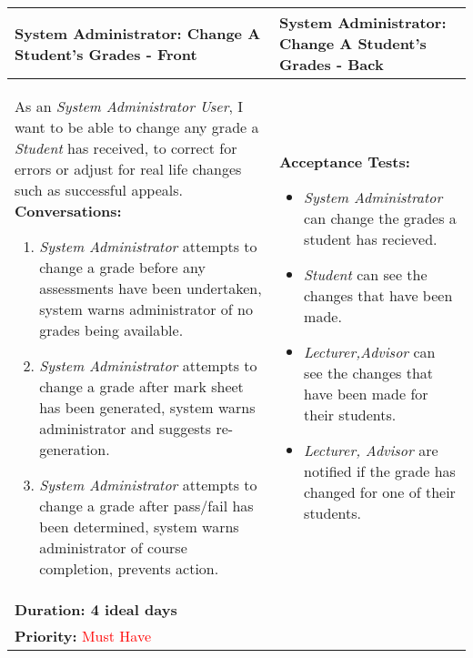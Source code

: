 \documentclass[11pt]{article}
\begin{document}
\begin{center}
\begin{tabular}{ | m{8cm}  |  m{8cm}  | } 
 \hline
 \textbf{System Administrator: Change A Student's Grades - Front} &  \textbf{System Administrator: Change A Student's Grades - Back}  \\ 
  \hline
As an \emph{System Administrator User}, I want to be able to change any grade a \emph{Student} has received, to correct for errors or adjust for real life changes such as successful appeals.  \newline
\textbf{Conversations:}
\begin{enumerate}
\item{\emph{System Administrator} attempts to change a grade before any assessments have been undertaken, system warns administrator of no grades being available.}
\item{\emph{System Administrator} attempts to change a grade after mark sheet has been generated, system warns administrator and suggests re-generation.}
\item{\emph{System Administrator} attempts to change a grade after pass/fail has been determined, system warns administrator of course completion, prevents action.}
\end{enumerate}
& \textbf{Acceptance Tests:} 
\begin{itemize}
\item{\emph{System Administrator} can change the grades a student has recieved.}
\item{\emph{Student} can see the changes that have been made.}
\item{\emph{Lecturer,Advisor} can see the changes that have been made for their students.}
\item{\emph{Lecturer, Advisor} are notified if the grade has changed for one of their students.}
\end{itemize} \\
\textbf{Duration: 4 ideal days} &\\
\textbf{Priority:}  \textcolor{red}{Must Have} & \\
 \hline
\end{tabular}
\end{center}
\end{document}

